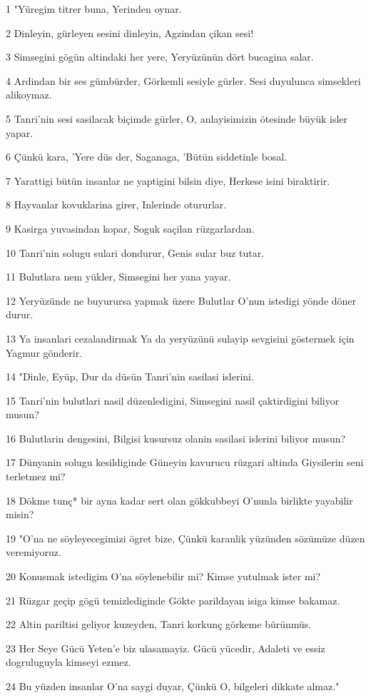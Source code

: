 \par 1 "Yüregim titrer buna, Yerinden oynar.
\par 2 Dinleyin, gürleyen sesini dinleyin, Agzindan çikan sesi!
\par 3 Simsegini gögün altindaki her yere, Yeryüzünün dört bucagina salar.
\par 4 Ardindan bir ses gümbürder, Görkemli sesiyle gürler. Sesi duyulunca simsekleri alikoymaz.
\par 5 Tanri'nin sesi sasilacak biçimde gürler, O, anlayisimizin ötesinde büyük isler yapar.
\par 6 Çünkü kara, 'Yere düs der, Saganaga, 'Bütün siddetinle bosal.
\par 7 Yarattigi bütün insanlar ne yaptigini bilsin diye, Herkese isini biraktirir.
\par 8 Hayvanlar kovuklarina girer, Inlerinde otururlar.
\par 9 Kasirga yuvasindan kopar, Soguk saçilan rüzgarlardan.
\par 10 Tanri'nin solugu sulari dondurur, Genis sular buz tutar.
\par 11 Bulutlara nem yükler, Simsegini her yana yayar.
\par 12 Yeryüzünde ne buyurursa yapmak üzere Bulutlar O'nun istedigi yönde döner durur.
\par 13 Ya insanlari cezalandirmak Ya da yeryüzünü sulayip sevgisini göstermek için Yagmur gönderir.
\par 14 "Dinle, Eyüp, Dur da düsün Tanri'nin sasilasi islerini.
\par 15 Tanri'nin bulutlari nasil düzenledigini, Simsegini nasil çaktirdigini biliyor musun?
\par 16 Bulutlarin dengesini, Bilgisi kusursuz olanin sasilasi islerini biliyor musun?
\par 17 Dünyanin solugu kesildiginde Güneyin kavurucu rüzgari altinda Giysilerin seni terletmez mi?
\par 18 Dökme tunç* bir ayna kadar sert olan gökkubbeyi O'nunla birlikte yayabilir misin?
\par 19 "O'na ne söyleyecegimizi ögret bize, Çünkü karanlik yüzünden sözümüze düzen veremiyoruz.
\par 20 Konusmak istedigim O'na söylenebilir mi? Kimse yutulmak ister mi?
\par 21 Rüzgar geçip gögü temizlediginde Gökte parildayan isiga kimse bakamaz.
\par 22 Altin pariltisi geliyor kuzeyden, Tanri korkunç görkeme bürünmüs.
\par 23 Her Seye Gücü Yeten'e biz ulasamayiz. Gücü yücedir, Adaleti ve essiz dogruluguyla kimseyi ezmez.
\par 24 Bu yüzden insanlar O'na saygi duyar, Çünkü O, bilgeleri dikkate almaz."

